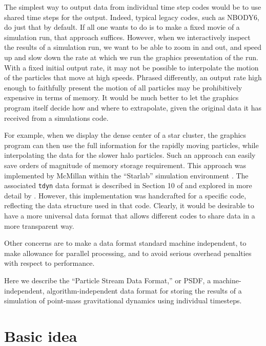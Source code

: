 \documentclass[5p,authoryear]{elsarticle}
\begin{document}
The simplest way to output data from individual time step codes would
be to use shared time steps for the output.  Indeed, typical legacy
codes, such as NBODY6, do just that by default.  If all one wants to
do is to make a fixed movie of a simulation run, that approach
suffices.  However, when we interactively inspect the results of a
simulation run, we want to be able to zoom in and out, and speed up
and slow down the rate at which we run the graphics presentation of
the run.  With a fixed initial output rate, it may not be possible to
interpolate the motion of the particles that move at high speeds.
Phrased differently, an output rate high enough to faithfully present
the motion of all particles may be prohibitively expensive in terms of
memory.  It would be much better to let the graphics program itself
decide how and where to extrapolate, given the original data it has
received from a simulations code.

For example, when we display the dense center of a star cluster, the
graphics program can then use the full information for the rapidly
moving particles, while interpolating the data for the slower halo
particles.  Such an approach can easily save orders of magnitude of
memory storage requirement.  This approach was implemented by McMillan
within the ``Starlab'' simulation environment
\citep{PortegiesZwart2001}.  The associated {\tt tdyn} data format is
described in Section 10 of \citet{Hut2001} and explored in more detail
by \citet{Faber2010}.  However, this implementation was handcrafted
for a specific code, reflecting the data structure used in that code.
Clearly, it would be desirable to have a more universal data format
that allows different codes to share data in a more transparent way.

Other concerns are to make a data format standard machine independent,
to make allowance for parallel processing, and to avoid serious
overhead penalties with respect to performance.

Here we describe the ``Particle Stream Data Format,'' or PSDF, a
machine-independent, algorithm-independent data format for storing the
results of a simulation of point-mass gravitational dynamics using
individual timesteps.

\section{Basic idea}
\end{document}
